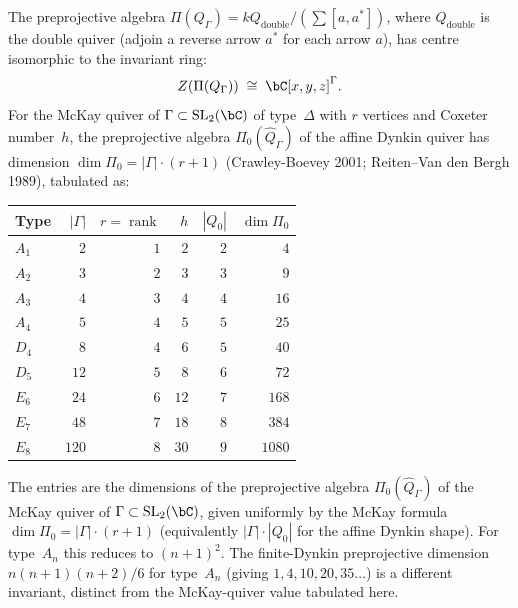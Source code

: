 \begin{proposition}
\label{prop:preprojective-mckay}
The preprojective algebra $\Pi(Q_\Gamma) = kQ_{\mathrm{double}}/
(\sum [a, a^*])$, where $Q_{\mathrm{double}}$ is the double quiver
(adjoin a reverse arrow $a^*$ for each arrow $a$), has centre
isomorphic to the invariant ring:
\[
Z(\Pi(Q_\Gamma)) \;\cong\; \bC[x,y,z]^\Gamma.
\]
For the McKay quiver of $\Gamma \subset \mathrm{SL}_2(\bC)$ of
type~$\Delta$ with $r$ vertices and Coxeter number~$h$, the
preprojective algebra $\Pi_0(\widehat{Q}_\Gamma)$ of the affine
Dynkin quiver has dimension
$\dim \Pi_0 = |\Gamma| \cdot (r+1)$
\textup{(}Crawley-Boevey 2001; Reiten--Van den Bergh 1989\textup{)},
tabulated as:
\begin{center}
\small
\renewcommand{\arraystretch}{1.2}
\begin{tabular}{lrrrrr}
\textbf{Type} & $|\Gamma|$ & $r = \operatorname{rank}$
 & $h$ & $|Q_0|$ & $\dim\Pi_0$ \\
\hline
$A_1$ & $2$ & $1$ & $2$ & $2$ & $4$ \\
$A_2$ & $3$ & $2$ & $3$ & $3$ & $9$ \\
$A_3$ & $4$ & $3$ & $4$ & $4$ & $16$ \\
$A_4$ & $5$ & $4$ & $5$ & $5$ & $25$ \\
$D_4$ & $8$ & $4$ & $6$ & $5$ & $40$ \\
$D_5$ & $12$ & $5$ & $8$ & $6$ & $72$ \\
$E_6$ & $24$ & $6$ & $12$ & $7$ & $168$ \\
$E_7$ & $48$ & $7$ & $18$ & $8$ & $384$ \\
$E_8$ & $120$ & $8$ & $30$ & $9$ & $1080$
\end{tabular}
\end{center}
The entries are the dimensions of the preprojective algebra
$\Pi_0(\widehat{Q}_\Gamma)$ of the McKay quiver of $\Gamma \subset
\mathrm{SL}_2(\bC)$, given uniformly by the McKay formula
$\dim \Pi_0 = |\Gamma| \cdot (r+1)$
\textup{(}equivalently $|\Gamma| \cdot |Q_0|$ for the affine
Dynkin shape\textup{)}. For type~$A_n$ this reduces to
$(n+1)^2$. The finite-Dynkin preprojective dimension
$n(n+1)(n+2)/6$ for type~$A_n$ \textup{(}giving $1, 4, 10, 20, 35
\ldots$\textup{)} is a different invariant, distinct from
the McKay-quiver value tabulated here.
\end{proposition}

